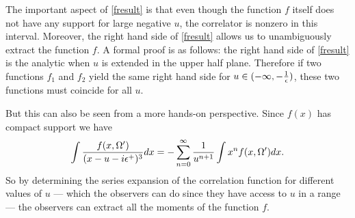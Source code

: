 \documentclass[12pt]{article}
\newcommand{\be}{\begin{equation}}
\newcommand{\ee}{\end{equation}}
\def \sph{{\Omega}}
\begin{document}
The important aspect of \eqref{fresult} is that even though the function $f$ itself does not have any support for large negative $u$, the correlator is nonzero in this interval.  Moreover, the right hand side of \eqref{fresult} allows us to unambiguously extract the function $f$. A formal proof is as follows: the right hand side of \eqref{fresult} is the analytic when $u$ is extended in the upper half plane. Therefore if two functions $f_1$ and $f_2$ yield the same right hand side for  $u \in (-\infty, -{1 \over \epsilon})$, these two functions must coincide for all $u$.

But this can also be seen from a more hands-on perspective. Since $f(x)$ has compact support we have
\be
\label{fseries}
\int {f(x, \sph') \over (x - u - i \epsilon^{+})^3} d x = -\sum_{n=0}^{\infty} {1 \over  u^{n+1}} \int x^n f(x, \sph') d x.
\ee
So by determining the series expansion of the correlation function for different values of $u$ --- which the observers can do since they have access to $u$ in a range  --- the observers can extract all the moments of the function $f$.
\end{document}
